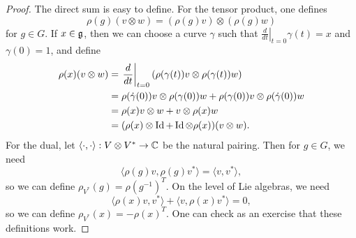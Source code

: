 \begin{proof}
  The direct sum is easy to define.
  For the tensor product, one defines
  \[
    \rho(g)(v \otimes w)
    = (\rho(g)v) \otimes (\rho(g)w)
  \]
  for $g \in G$.
  If $x \in \mathfrak{g}$, then we can choose
  a curve $\gamma$ such that
  $\left.\frac{d}{dt}\right|_{t = 0} \gamma(t) = x$
  and $\gamma(0) = 1$,
  and define
  \begin{align*}
    \rho(x)(v \otimes w)
    &= \left.\frac{d}{dt}\right|_{t = 0}
    (\rho(\gamma(t)) v \otimes \rho(\gamma(t)) w) \\
    &= \rho(\dot{\gamma}(0))v \otimes \rho(\gamma(0))w
    + \rho(\gamma(0))v \otimes \rho(\dot{\gamma}(0))w \\
    &= \rho(x)v \otimes w + v \otimes \rho(x)w \\
    &= (\rho(x) \otimes \operatorname{Id} + \operatorname{Id} \otimes \rho(x))(v \otimes w).
  \end{align*}
  For the dual, let
  $\langle \cdot, \cdot \rangle : V \otimes V^* \to \mathbb{C}$
  be the natural pairing. Then for
  $g \in G$, we need
  \[
    \langle \rho(g) v, \rho(g) v^* \rangle
    = \langle v, v^* \rangle,
  \]
  so we can define
  $\rho_{V^*}(g) = \rho(g^{-1})^T$.
  On the level of Lie algebras, we need
  \[
    \langle \rho(x) v, v^* \rangle
    + \langle v, \rho(x) v^* \rangle = 0,
  \]
  so we can define
  $\rho_{V^*}(x) = -\rho(x)^T$. One can
  check as an exercise that these
  definitions work.
\end{proof}

